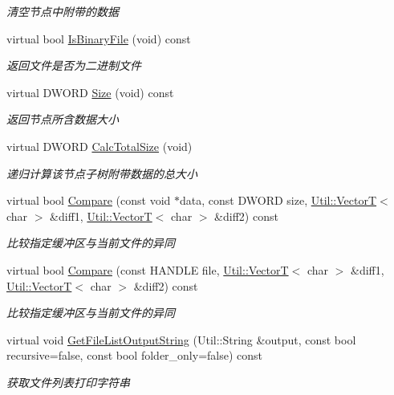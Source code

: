 \begin{DoxyCompactItemize}
\begin{DoxyCompactList}\small\item\em 清空节点中附带的数据 \end{DoxyCompactList}\item 
virtual bool \hyperlink{class_file_sys_1_1_node_acad64b2ca2b78a0b634a49e6214c1aba}{Is\-Binary\-File} (void) const 
\begin{DoxyCompactList}\small\item\em 返回文件是否为二进制文件 \end{DoxyCompactList}\item 
virtual D\-W\-O\-R\-D \hyperlink{class_file_sys_1_1_node_a4d981a125be5d9e4810bf95f86dbd6bd}{Size} (void) const 
\begin{DoxyCompactList}\small\item\em 返回节点所含数据大小 \end{DoxyCompactList}\item 
virtual D\-W\-O\-R\-D \hyperlink{class_file_sys_1_1_node_a6f73b0fcebfed60297a7472a954be9eb}{Calc\-Total\-Size} (void)
\begin{DoxyCompactList}\small\item\em 递归计算该节点子树附带数据的总大小 \end{DoxyCompactList}\item 
virtual bool \hyperlink{class_file_sys_1_1_node_ada9acb89cd979b2e37d169d67e9ba816}{Compare} (const void $\ast$data, const D\-W\-O\-R\-D size, \hyperlink{class_util_1_1_vector_t}{Util\-::\-Vector\-T}$<$ char $>$ \&diff1, \hyperlink{class_util_1_1_vector_t}{Util\-::\-Vector\-T}$<$ char $>$ \&diff2) const 
\begin{DoxyCompactList}\small\item\em 比较指定缓冲区与当前文件的异同 \end{DoxyCompactList}\item 
virtual bool \hyperlink{class_file_sys_1_1_node_a61fe784ffa56a134715baa35a5a7e239}{Compare} (const H\-A\-N\-D\-L\-E file, \hyperlink{class_util_1_1_vector_t}{Util\-::\-Vector\-T}$<$ char $>$ \&diff1, \hyperlink{class_util_1_1_vector_t}{Util\-::\-Vector\-T}$<$ char $>$ \&diff2) const 
\begin{DoxyCompactList}\small\item\em 比较指定缓冲区与当前文件的异同 \end{DoxyCompactList}\item 
virtual void \hyperlink{class_file_sys_1_1_node_aea400658729cd06ba5c404ed67dd5abb}{Get\-File\-List\-Output\-String} (Util\-::\-String \&output, const bool recursive=false, const bool folder\-\_\-only=false) const 
\begin{DoxyCompactList}\small\item\em 获取文件列表打印字符串 \end{DoxyCompactList}\end{DoxyCompactItemize}


